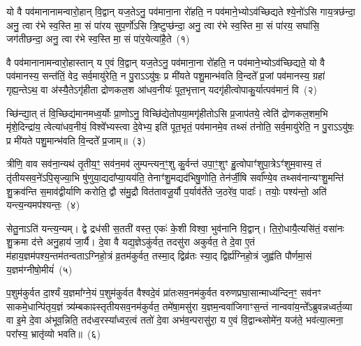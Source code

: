 \setcounter{anuvakam}{0}
यो वै पव॑मानानामन्वारो॒हान् वि॒द्वान् यज॒ते\-ऽनु॒ पव॑माना॒ना रो॑हति॒ न पव॑माने॒भ्यो\-ऽव॑च्छिद्यते श्ये॒नो॑\-ऽसि गाय॒त्रछ॑न्दा॒ अनु॒ त्वा र॑भे स्व॒स्ति मा॒ सं पा॑रय सुप॒र्णो॑\-ऽसि त्रि॒ष्टुप्छ॑न्दा॒ अनु॒ त्वा र॑भे स्व॒स्ति मा॒ सं पा॑रय॒ सघा॑सि॒ जग॑तीछन्दा॒ अनु॒ त्वा र॑भे स्व॒स्ति मा॒ सं पा॑र॒येत्या॑है॒ते~(१)

वै पव॑मानानामन्वारो॒हास्तान् य ए॒वं वि॒द्वान् यज॒ते\-ऽनु॒ पव॑माना॒ना रो॑हति॒ न पव॑माने॒भ्यो\-ऽव॑च्छिद्यते॒ यो वै पव॑मानस्य॒ सन्त॑तिं॒ वेद॒ सर्व॒मायु॑रेति॒ न पु॒रा\-ऽऽ\-यु॑षः॒ प्र मी॑यते पशु॒मान्भ॑वति वि॒न्दते᳚ प्र॒जां पव॑मानस्य॒ ग्रहा॑ गृह्य॒न्ते\-ऽथ॒ वा अ॑स्यै॒ते\-ऽगृ॑हीता द्रोणकल॒श आ॑धव॒नीयः॑ पूत॒भृत्तान् यदगृ॑हीत्वोपाकु॒र्यात्पव॑मानं॒ वि~(२)

च्छि॑न्द्या॒त् तं वि॒च्छिद्य॑मानमध्व॒र्योः प्रा॒णो\-ऽनु॒ विच्छि॑द्येतोप\-या॒मगृ॑हीतो\-ऽसि प्र॒जा\-प॑तये॒ त्वेति॑ द्रोणकल॒शम॒भि मृ॑शे॒दिन्द्रा॑य॒ त्वेत्या॑धव॒नीयं॒ विश्वे᳚भ्यस्त्वा दे॒वेभ्य॒ इति॑ पूत॒भृतं॒ पव॑मानमे॒व तथ्सं त॑नोति॒ सर्व॒मायु॑रेति॒ न पु॒रा\-ऽऽ\-यु॑षः॒ प्र मी॑यते पशु॒मान्भ॑वति वि॒न्दते᳚ प्र॒जाम्॥~(३)

{\anuvakamend[{ए॒ते वि द्विच॑त्वारिꣳशच्च}]}%

त्रीणि॒ वाव सव॑ना॒न्यथ॑ तृ॒तीय॒ꣳ॒ सव॑न॒मव॑ लुम्पन्त्यन॒ꣳ॒शु कु॒र्वन्त॑ उपा॒ꣳ॒शुꣳ हु॒त्वोपाꣳ॑शुपा॒त्रे\-ऽꣳ॑शुम॒वास्य॒ तं तृ॑तीयसव॒ने॑\-ऽपि॒सृज्या॒भि षु॑णुया॒द्यदा᳚प्या॒यय॑ति॒ तेनाꣳ॑शु॒मद्यद॑भिषु॒णोति॒ तेन॑र्जी॒षि सर्वा᳚ण्ये॒व तथ्सव॑नान्यꣳशु॒मन्ति॑ शु॒क्रव॑न्ति स॒माव॑द्वीर्याणि करोति॒ द्वौ स॑मु॒द्रौ वित॑तावजू॒र्यौ प॒र्याव॑र्तेते ज॒ठरे॑व॒ पादाः᳚। तयोः॒ पश्य॑न्तो॒ अति॑ यन्त्य॒न्यमप॑श्यन्तः॒~(४)

सेतु॒ना\-ऽति॑ यन्त्य॒न्यम्। द्वे द्रध॑सी स॒तती॑ वस्त॒ एकः॑ के॒शी विश्वा॒ भुव॑नानि वि॒द्वान्। ति॒रो॒धायै॒त्यसि॑तं॒ वसा॑नः शु॒क्रमा द॑त्ते अनु॒हाय॑ जा॒र्यै। दे॒वा वै यद्य॒ज्ञे\-ऽकु॑र्वत॒ तदसु॑रा अकुर्वत॒ ते दे॒वा ए॒तं म॑हाय॒ज्ञम॑पश्य॒न्तम॑तन्वता\-ऽ\-ग्निहो॒त्रं व्र॒तम॑कुर्वत॒ तस्मा॒द् द्विव्र॑तः स्या॒द् द्विर्\mbox{}ह्य॑ग्निहो॒त्रं जुह्व॑ति पौर्णमा॒सं य॒ज्ञम॑ग्नीषो॒मीयं॑~(५)

प॒शुम॑कुर्वत दा॒र्श्यं य॒ज्ञमा᳚ग्ने॒यं प॒शुम॑कुर्वत वैश्वदे॒वं प्रा॑तःसव॒नम॑कुर्वत वरुणप्रघा॒सान्माध्य॑न्दिन॒ꣳ॒ सव॑नꣳ साक\-मे॒धान्पि॑तृय॒ज्ञं त्र्य॑म्बकाꣴस्तृतीयसव॒नम॑कुर्वत॒ तमे॑षा॒मसु॑रा य॒ज्ञम॒न्व\-वा॑जिगाꣳ\-स॒न्तं नान्ववा॑य॒न्ते᳚\-ऽब्रुवन्नध्वर्त॒व्या वा इ॒मे दे॒वा अ॑भूव॒न्निति॒ तद॑ध्व॒रस्या᳚ध्वर॒त्वं ततो॑ दे॒वा अभ॑व॒न्परासु॑रा॒ य ए॒वं वि॒द्वान्थ्सोमे॑न॒ यज॑ते॒ भव॑त्या॒त्मना॒ परा᳚स्य॒ भ्रातृ॑व्यो भवति॥~(६)

